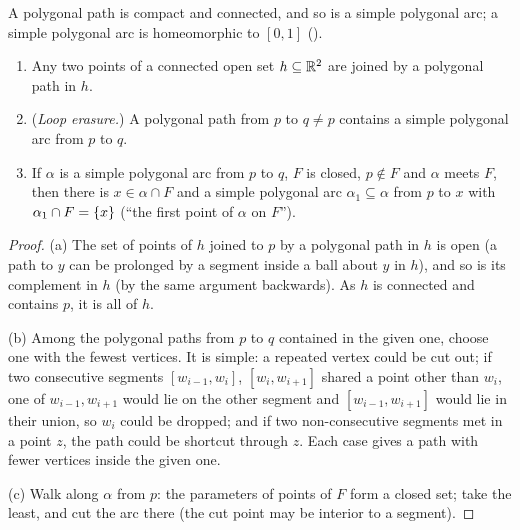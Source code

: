 
A polygonal path is compact and connected, and so is a simple polygonal arc; a simple polygonal arc
is homeomorphic to $[0,1]$ ().

\begin{proposition}\label{prop:polypath}
\leavevmode
\begin{enumerate}[label=(\alph*)]
\item Any two points of a connected open set $h\subseteq\mathbb{R}^2$ are joined by a polygonal path in $h$.
\item (\emph{Loop erasure.}) A polygonal path from $p$ to $q\neq p$ contains a simple polygonal arc
from $p$ to $q$.
\item If $\alpha$ is a simple polygonal arc from $p$ to $q$, $F$ is closed, $p\notin F$ and $\alpha$
meets $F$, then there is $x\in\alpha\cap F$ and a simple polygonal arc $\alpha_1\subseteq\alpha$ from
$p$ to $x$ with $\alpha_1\cap F=\left\{ x \right\}$ (``the first point of $\alpha$ on $F$'').
\end{enumerate}
\end{proposition}

\begin{proof}
(a) The set of points of $h$ joined to $p$ by a polygonal path in $h$ is open (a path to $y$ can be
prolonged by a segment inside a ball about $y$ in $h$), and so is its complement in $h$ (by the same
argument backwards). As $h$ is connected and contains $p$, it is all of $h$.

(b) Among the polygonal paths from $p$ to $q$ contained in the given one, choose one with the
fewest vertices. It is simple: a repeated vertex could be cut out; if two consecutive segments
$[w_{i-1},w_i]$, $[w_i,w_{i+1}]$ shared a point other than $w_i$, one of $w_{i-1},w_{i+1}$ would lie
on the other segment and $[w_{i-1},w_{i+1}]$ would lie in their union, so $w_i$ could be dropped;
and if two non-consecutive segments met in a point $z$, the path could be shortcut through $z$. Each
case gives a path with fewer vertices inside the given one.

(c) Walk along $\alpha$ from $p$: the parameters of points of $F$ form a closed set; take the least,
and cut the arc there (the cut point may be interior to a segment).
\end{proof}


